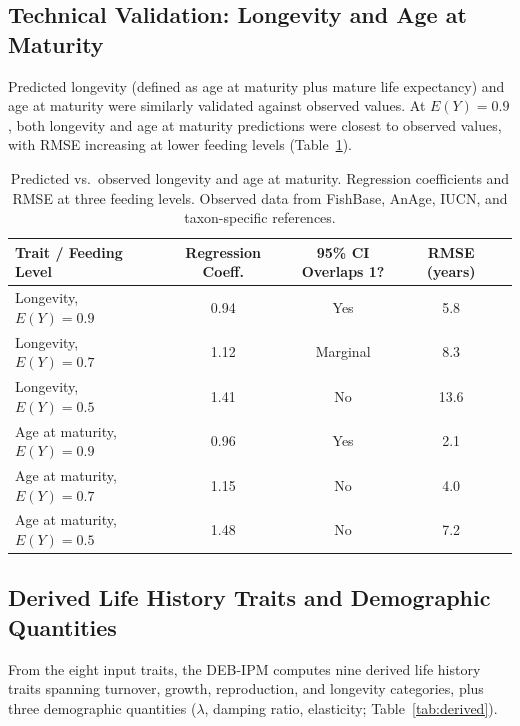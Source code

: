 \documentclass[11pt]{article}
\begin{document}
\subsection{Technical Validation: Longevity and Age at Maturity}

Predicted longevity (defined as age at maturity plus mature life expectancy) and age at maturity were similarly validated against observed values. At $E(Y) = 0.9$, both longevity and age at maturity predictions were closest to observed values, with RMSE increasing at lower feeding levels (Table~\ref{tab:longevity}).

\begin{table}[H]
\centering
\caption{Predicted vs.\ observed longevity and age at maturity. Regression coefficients and RMSE at three feeding levels. Observed data from FishBase, AnAge, IUCN, and taxon-specific references.}
\label{tab:longevity}
\begin{tabular}{lcccc}
\toprule
\textbf{Trait / Feeding Level} & \textbf{Regression Coeff.} & \textbf{95\% CI Overlaps 1?} & \textbf{RMSE (years)} \\
\midrule
Longevity, $E(Y) = 0.9$ & 0.94 & Yes & 5.8 \\
Longevity, $E(Y) = 0.7$ & 1.12 & Marginal & 8.3 \\
Longevity, $E(Y) = 0.5$ & 1.41 & No & 13.6 \\
\midrule
Age at maturity, $E(Y) = 0.9$ & 0.96 & Yes & 2.1 \\
Age at maturity, $E(Y) = 0.7$ & 1.15 & No & 4.0 \\
Age at maturity, $E(Y) = 0.5$ & 1.48 & No & 7.2 \\
\bottomrule
\end{tabular}
\end{table}

\subsection{Derived Life History Traits and Demographic Quantities}

From the eight input traits, the DEB-IPM computes nine derived life history traits spanning turnover, growth, reproduction, and longevity categories, plus three demographic quantities ($\lambda$, damping ratio, elasticity; Table~\ref{tab:derived}).
\end{document}
